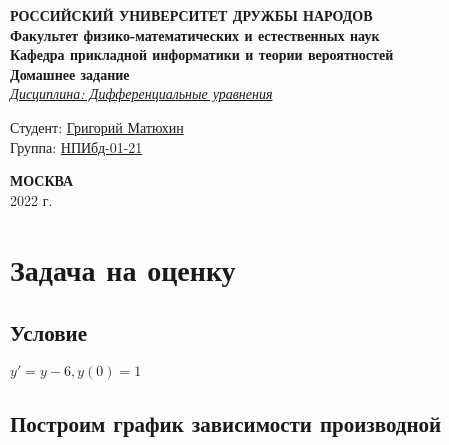 \documentclass[12pt]{article}
\begin{document}
\begin{titlepage}

	\begin{center}
		\hfill \break
		\textbf{
			\large{РОССИЙСКИЙ УНИВЕРСИТЕТ ДРУЖБЫ НАРОДОВ}\\
			\normalsize{Факультет физико-математических и естественных наук}\\
			\normalsize{Кафедра прикладной информатики и теории вероятностей}\\
		}
		\vspace*{\fill}
		\Large{\textbf{Домашнее задание }}
		\\
		\underline{\textit{\normalsize{Дисциплина: Дифференциальные уравнения}}}
		\vspace*{\fill}

	\end{center}

	\begin{flushright}
		Студент: \underline{Григорий Матюхин}\\ \vspace{0.5cm}
		Группа: \underline{НПИбд-01-21}
	\end{flushright}


	\begin{center} \textbf{МОСКВА} \\ 2022 г. \end{center}
	\thispagestyle{empty} %

\end{titlepage}
\newpage
\tableofcontents
\newpage

\section{Задача на оценку}
\subsection*{Условие}
$y' = y - 6, y(0) = 1$

\subsection{Построим график зависимости производной}
\end{document}
